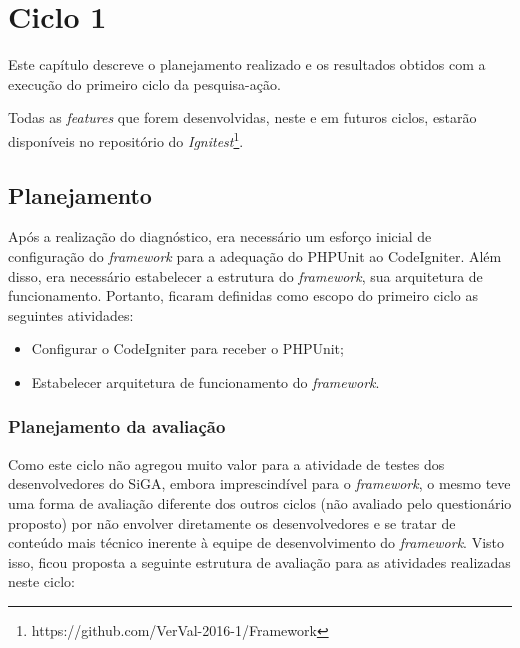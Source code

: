 \chapter{Ciclo 1}
  
  Este capítulo descreve o planejamento realizado e os resultados obtidos com a execução do primeiro ciclo da pesquisa-ação.
  
  Todas as \textit{features} que forem desenvolvidas, neste e em futuros ciclos, estarão disponíveis no repositório do \textit{Ignitest}\footnote{https://github.com/VerVal-2016-1/Framework}.
  
  \section{Planejamento}
  
      Após a realização do diagnóstico, era necessário um esforço inicial de configuração do \textit{framework} para a 
      adequação do PHPUnit ao CodeIgniter. Além disso, era necessário estabelecer a estrutura do \textit{framework},
      sua arquitetura de funcionamento. Portanto, ficaram definidas como escopo do primeiro ciclo as seguintes atividades:
      
      \begin{itemize}
    
    \item Configurar o CodeIgniter para receber o PHPUnit;
    
    \item Estabelecer arquitetura de funcionamento do \textit{framework}.
    
      \end{itemize}
      
      
      \subsection{Planejamento da avaliação}
      
      Como este ciclo não agregou muito valor para a atividade de testes dos desenvolvedores do SiGA,
      embora imprescindível para o \textit{framework}, o mesmo teve uma forma de avaliação diferente
      dos outros ciclos (não avaliado pelo questionário proposto) por não envolver diretamente os desenvolvedores e se
      tratar de conteúdo mais técnico inerente à equipe de desenvolvimento do \textit{framework}. Visto isso, ficou proposta
      a seguinte estrutura de avaliação para as atividades realizadas neste ciclo:
      
